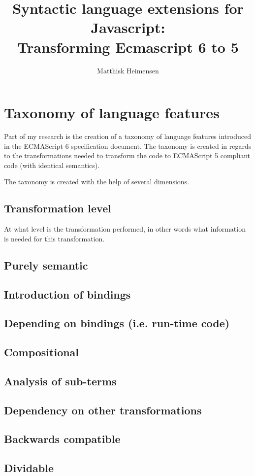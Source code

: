 \documentclass[10pt,a4paper,draft]{article}
\title{%
	Syntactic language extensions for Javascript: \\
	\large Transforming Ecmascript 6 to 5}
\author{Matthisk Heimensen}
\begin{document}
	\maketitle
	
\section{Taxonomy of language features}
Part of my research is the creation of a taxonomy of language features introduced in the ECMAScript 6 specification document. The taxonomy is created in regards to the transformations needed to transform the code to ECMAScript 5 compliant code (with identical semantics).

The taxonomy is created with the help of several dimensions.

\subsection{Transformation level}
At what level is the transformation performed, in other words what information is needed for this transformation.

\subsection{Purely semantic}

\subsection{Introduction of bindings}

\subsection{Depending on bindings (i.e. run-time code)}

\subsection{Compositional}

\subsection{Analysis of sub-terms}

\subsection{Dependency on other transformations}

\subsection{Backwards compatible}

\subsection{Dividable}


{}

\end{document}
